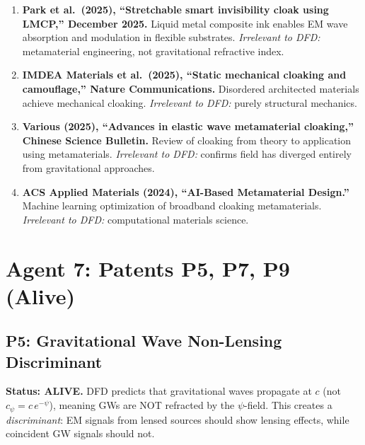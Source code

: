\documentclass[11pt]{article}
\begin{document}
\begin{tcolorbox}[colback=green!5!white, colframe=green!50!black,
  title=\textbf{Agent 6: NEW LITERATURE REVIEWED}]

\begin{enumerate}

\item \textbf{Park et al.\ (2025), ``Stretchable smart invisibility
  cloak using LMCP,'' December 2025.}
  Liquid metal composite ink enables EM wave absorption and modulation
  in flexible substrates. \emph{Irrelevant to DFD:} metamaterial
  engineering, not gravitational refractive index.

\item \textbf{IMDEA Materials et al.\ (2025), ``Static mechanical
  cloaking and camouflage,'' Nature Communications.}
  Disordered architected materials achieve mechanical cloaking.
  \emph{Irrelevant to DFD:} purely structural mechanics.

\item \textbf{Various (2025), ``Advances in elastic wave metamaterial
  cloaking,'' Chinese Science Bulletin.}
  Review of cloaking from theory to application using metamaterials.
  \emph{Irrelevant to DFD:} confirms field has diverged entirely from
  gravitational approaches.

\item \textbf{ACS Applied Materials (2024), ``AI-Based Metamaterial
  Design.''}
  Machine learning optimization of broadband cloaking metamaterials.
  \emph{Irrelevant to DFD:} computational materials science.

\end{enumerate}
\end{tcolorbox}

\section{Agent 7: Patents P5, P7, P9 (Alive)}

\subsection{P5: Gravitational Wave Non-Lensing Discriminant}

\textbf{Status: ALIVE.} DFD predicts that gravitational waves propagate
at $c$ (not $c_\psi = c\,e^{-\psi}$), meaning GWs are NOT refracted by
the $\psi$-field. This creates a \emph{discriminant}: EM signals from
lensed sources should show lensing effects, while coincident GW signals
should not.
\end{document}

